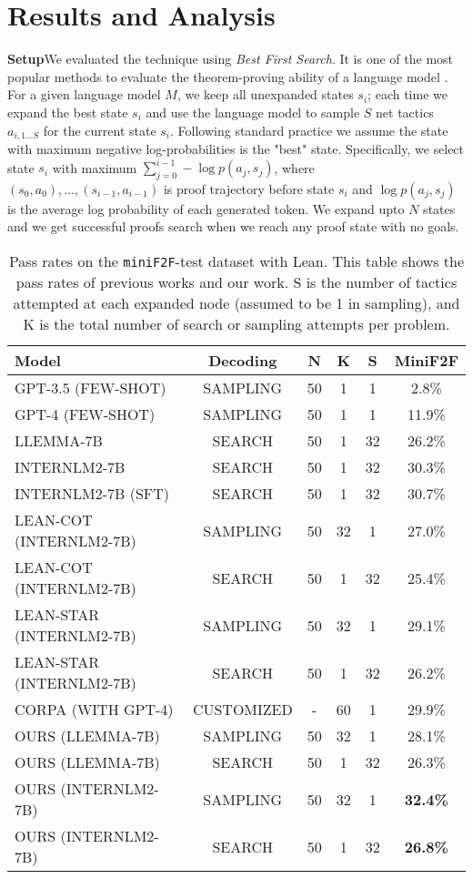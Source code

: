 \section{Results and Analysis}
\textbf{Setup}\quad We evaluated the technique using \textit{Best First Search}. It is one of the most popular methods to evaluate the theorem-proving ability of a language model \cite{polu2020generative, yang2023leandojo, azerbayev2023llemma, lean-star}. For a given language model $M$, we keep all unexpanded states $s_i$; each time we expand the best state $s_i$ and use the language model to sample $S$ net tactics $a_{i,1...S}$ for the current state $s_i$.
Following standard practice \cite{polu2020generative, yang2023leandojo, llmstep, lean-star} we assume the state with maximum negative log-probabilities is the "best" state. Specifically, we select state $s_i$ with maximum $\sum_{j=0}^{i-1} -\log p(a_j, s_j)$, where $(s_0, a_0), ...,(s_{i-1},a_{i-1})$ is proof trajectory before state $s_i$ and $\log p(a_j,s_j)$ is the average log probability of each generated token. We expand upto $N$ states and we get successful proofs search when we reach any proof state with no goals. 
\begin{table}
\centering
\begin{tabular}{lccccc}
\toprule
Model & Decoding & N & K & S & MiniF2F \\ 
\midrule
GPT-3.5 (FEW-SHOT) & SAMPLING & 50 & 1 & 1 & 2.8\% \\
GPT-4 (FEW-SHOT) & SAMPLING & 50 & 1 & 1 & 11.9\% \\
LLEMMA-7B & SEARCH & 50 & 1 & 32 & 26.2\% \\
INTERNLM2-7B & SEARCH & 50 & 1 & 32 & 30.3\% \\
INTERNLM2-7B (SFT) & SEARCH & 50 & 1 & 32 & 30.7\% \\
LEAN-COT (INTERNLM2-7B) & SAMPLING & 50 & 32 & 1 & 27.0\% \\
LEAN-COT (INTERNLM2-7B) & SEARCH & 50 & 1 & 32 & 25.4\% \\
LEAN-STAR (INTERNLM2-7B) & SAMPLING & 50 & 32 & 1 & 29.1\% \\
LEAN-STAR (INTERNLM2-7B) & SEARCH & 50 & 1 & 32 & 26.2\% \\
CORPA (WITH GPT-4) & CUSTOMIZED & - & 60 & 1 & 29.9\% \\
OURS (LLEMMA-7B) & SAMPLING & 50 & 32 & 1 & 28.1\% \\
OURS (LLEMMA-7B) & SEARCH & 50 & 1 & 32 & 26.3\% \\
OURS (INTERNLM2-7B) & SAMPLING & 50 & 32 & 1 & \textbf{32.4\%} \\
OURS (INTERNLM2-7B) & SEARCH & 50 & 1 & 32 & \textbf{26.8\%} \\ 
\bottomrule
\end{tabular}
\caption{Pass rates on the \texttt{miniF2F}-test dataset with Lean. This table shows the pass rates of previous works and our work. S is the number of tactics attempted at each expanded node (assumed to be 1 in sampling), and K is the total number of search or sampling attempts per problem.}
\label{tab:main-results}
\end{table}

